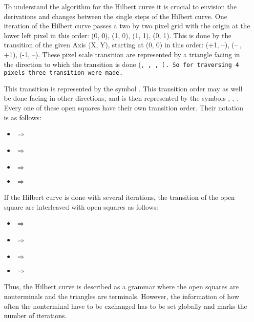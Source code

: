 To understand the algorithm for the Hilbert curve it is crucial to envision the derivations and changes between the single steps of the Hilbert curve. One iteration of the Hilbert curve passes a two by two pixel grid with the origin at the lower left pixel in this order: (0, 0), (1, 0), (1, 1), (0, 1). This is done by the transition of the given Axis (X, Y), starting at (0, 0) in this order: (+1, --), (-- , +1), (-1, --). These pixel scale transition are represented by a triangle facing in the direction to which the transition is done (\tt, \tl, \tb, \tr). So for traversing 4 pixels three transition were made.

This transition is represented by the symbol \sqr. This transition order may as well be done facing in other directions, and is then represented by the symbols \sqt, \sql, \sqb. Every one of these open squares have their own transition order. Their notation is as follows:

\begin{itemize}%
   \item \sqr $\Rightarrow$ \tr \tt \tl
   \item \sqt $\Rightarrow$ \tt \tr \tb
   \item \sql $\Rightarrow$ \tl \tb \tr
   \item \sqb $\Rightarrow$ \tb \tl \tt
\end{itemize}%

If the Hilbert curve is done with several iterations, the transition of the open square are interleaved with open squares as follows:

\begin{itemize}%
   \item \sqr $\Rightarrow$ \sqt \tr \sqr \tt \sqr \tl \sqb
   \item \sqt $\Rightarrow$ \sqr \tt \sqt \tr \sqt \tb \sql
   \item \sql $\Rightarrow$ \sqb \tl \sql \tb \sql \tr \sqt
   \item \sqb $\Rightarrow$ \sql \tb \sqb \tl \sqb \tt \sqr
\end{itemize}%

Thus, the Hilbert curve is described as a grammar where the open squares are nonterminals and the triangles are terminals. However, the information of how often the nonterminal have to be exchanged has to be set globally and marks the number of iterations.


